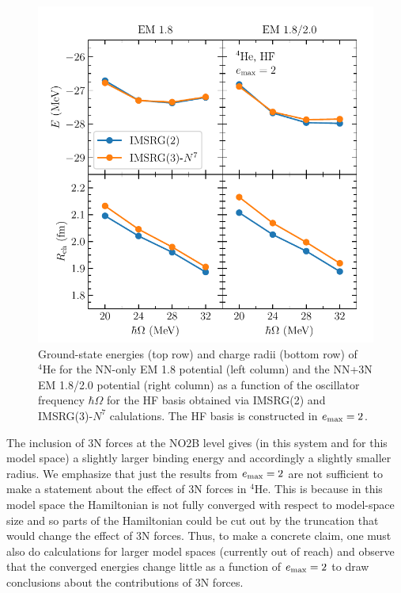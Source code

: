 \begin{figure}[t!]
    \begin{center}
        \includegraphics{thesis/doc/images/he4_HF_results}
    \end{center}
    \caption{
        Ground-state energies (top row) and charge radii (bottom row)
        of ${}^{4}\text{He}$
        for the NN-only EM 1.8 potential (left column)
        and the NN+3N EM 1.8/2.0 potential (right column)
        as a function of the oscillator frequency $\hbar \Omega$
        for the HF basis
        obtained via IMSRG(2) and IMSRG(3)-$N^7$ calulations.
        The HF basis is constructed in $e_{\text{max}}=2$.
    }\label{fig:he4_imsrg3_hf}
\end{figure}

The inclusion of 3N forces at the NO2B level gives
(in this system and for this model space)
a slightly larger binding energy
and accordingly a slightly smaller radius.
We emphasize that just the results from $e_{\text{max}}=2$
are not sufficient to make a statement
about the effect of 3N forces in ${}^{4}\text{He}$.
This is because in this model space
the Hamiltonian is not fully converged
with respect to model-space size
and so parts of the Hamiltonian could be cut out by the truncation
that would change the effect of 3N forces.
Thus, to make a concrete claim,
one must also do calculations for larger model spaces (currently out of reach)
and observe that the converged energies
change little as a function of $e_{\text{max}}=2$ to draw conclusions
about the contributions of 3N forces.


